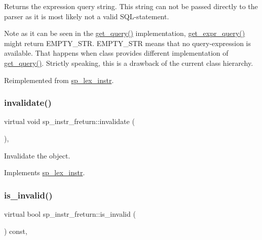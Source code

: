 \begin{DoxyReturn}{Returns}
the expression query string. This string can not be passed directly to the parser as it is most likely not a valid S\+QL-\/statement.
\end{DoxyReturn}
\begin{DoxyNote}{Note}
as it can be seen in the \mbox{\hyperlink{classsp__lex__instr_a8bbcccae8739634565f8be2134171b03}{get\+\_\+query()}} implementation, \mbox{\hyperlink{classsp__instr__freturn_adccc76ff6c7a1c0f72b58eda6e542e19}{get\+\_\+expr\+\_\+query()}} might return E\+M\+P\+T\+Y\+\_\+\+S\+TR. E\+M\+P\+T\+Y\+\_\+\+S\+TR means that no query-\/expression is available. That happens when class provides different implementation of \mbox{\hyperlink{classsp__lex__instr_a8bbcccae8739634565f8be2134171b03}{get\+\_\+query()}}. Strictly speaking, this is a drawback of the current class hierarchy. 
\end{DoxyNote}


Reimplemented from \mbox{\hyperlink{classsp__lex__instr_ad355d3ed08ae1fef4811fe6838ed78e2}{sp\+\_\+lex\+\_\+instr}}.

\mbox{\label{classsp__instr__freturn_a02bf622965c9cdbe481ce87a3e1051cf}} 
\subsubsection{\texorpdfstring{invalidate()}{invalidate()}}
{\footnotesize\ttfamily virtual void sp\+\_\+instr\+\_\+freturn\+::invalidate (\begin{DoxyParamCaption}{ }\end{DoxyParamCaption})\hspace{0.3cm}{\ttfamily [inline]}, {\ttfamily [virtual]}}

Invalidate the object. 

Implements \mbox{\hyperlink{classsp__lex__instr_ae9945d69ab5d91d6ce215f194beea882}{sp\+\_\+lex\+\_\+instr}}.

\mbox{\label{classsp__instr__freturn_aefb864f222cf52f923cf0ba0ce67943b}} 
\subsubsection{\texorpdfstring{is\+\_\+invalid()}{is\_invalid()}}
{\footnotesize\ttfamily virtual bool sp\+\_\+instr\+\_\+freturn\+::is\+\_\+invalid (\begin{DoxyParamCaption}{ }\end{DoxyParamCaption}) const\hspace{0.3cm}{\ttfamily [inline]}, {\ttfamily [virtual]}}


